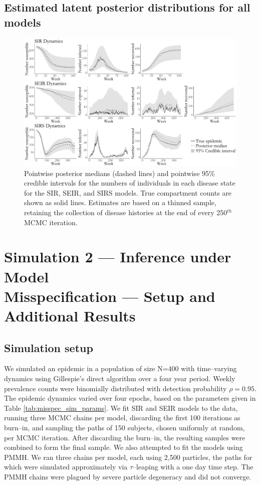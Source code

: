 \subsection{Estimated latent posterior distributions for all models}
\begin{figure}[htbp]
	\centering
	\includegraphics[width=\linewidth]{figures/sim1_latent_posts_all.pdf}
	\caption{Pointwise posterior medians (dashed lines) and pointwise 95\% credible intervals for the numbers of individuals in each disease state for the SIR, SEIR, and SIRS models. True compartment counts are shown as solid lines. Estimates are based on a thinned sample, retaining the collection of disease histories at the end of every 250$ ^{th} $ MCMC iteration.}
	\label{fig:sim1_latent_post_all}
\end{figure}


\section{Simulation 2 --- Inference under Model\\ Misspecification --- Setup and Additional Results}
\label{sec:bda_misspec_sim_details}
\subsection{Simulation setup}
We simulated an epidemic in a population of size N=400 with time--varying dynamics using Gillespie's direct algorithm over a four year period. Weekly prevalence counts were binomially distributed with detection probability $ \rho = 0.95 $. The epidemic dynamics varied over four epochs, based on the parameters given in Table \ref{tab:misspec_sim_params}. We fit SIR and SEIR models to the data, running three MCMC chains per model, discarding the first 100 iterations as burn--in, and sampling the paths of 150 subjects, chosen uniformly at random, per MCMC iteration. After discarding the burn--in, the resulting samples were combined to form the final sample. We also attempted to fit the models using PMMH. We ran three chains per model, each using 2,500 particles, the paths for which were simulated approximately via $ \tau$--leaping with a one day time step. The PMMH chains were plagued by severe particle degeneracy and did not converge.

